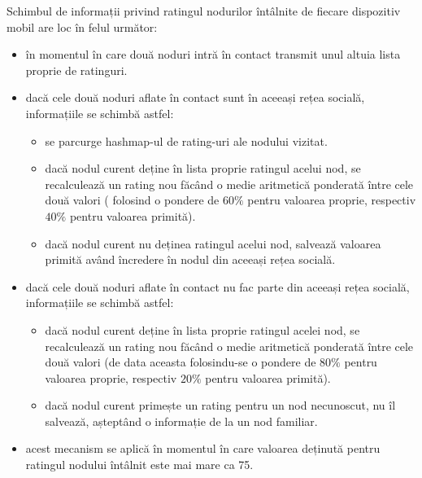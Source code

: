 \documentclass[12pt,a4paper]{report}
\begin{document}
Schimbul de informații privind ratingul nodurilor întâlnite de fiecare dispozitiv mobil are loc în felul următor:
\begin{itemize}
	\item în momentul în care două noduri intră în contact transmit unul altuia lista proprie de ratinguri.
	\item dacă cele două noduri aflate în contact sunt în aceeași rețea socială, informațiile se schimbă astfel:
	\begin{itemize}
		\item se parcurge hashmap-ul de rating-uri ale nodului vizitat.
		\item dacă nodul curent deține în lista proprie ratingul acelui nod, se recalculează un rating nou făcând o medie aritmetică ponderată între cele două valori ( folosind o pondere de $60\%$ pentru valoarea proprie, respectiv $40\%$ pentru valoarea primită).
		\item dacă nodul curent nu deținea ratingul acelui nod, salvează valoarea primită având încredere în nodul din aceeași rețea socială.
	\end{itemize}
	\item dacă cele două noduri aflate în contact nu fac parte din aceeași rețea socială, informațiile se schimbă astfel:
		\begin{itemize}
			\item dacă nodul curent deține în lista proprie ratingul acelei nod, se recalculează un rating nou făcând o medie aritmetică ponderată între cele două valori (de data aceasta folosindu-se o pondere de $80\%$ pentru valoarea proprie, respectiv $20\%$ pentru valoarea primită).
			\item dacă nodul curent primește un rating pentru un nod necunoscut, nu îl salvează, așteptând o informație de la un nod familiar.
		\end{itemize}
	\item acest mecanism se aplică în momentul în care valoarea deținută pentru ratingul nodului întâlnit este mai mare ca 75.
\end{itemize}
\end{document}
